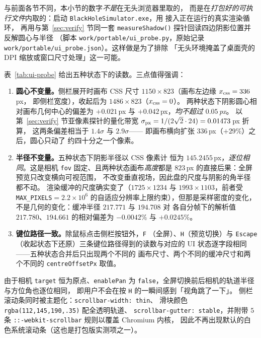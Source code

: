 与前面各节不同，本小节的数字\emph{不是}在无头浏览器里取的，
而是在\emph{打包好的可执行文件}内取的：启动
\texttt{BlackHoleSimulator.exe}，用
 接入正在运行的真实渲染循环，
再用与第~\ref{sec:verify} 节同一套 \texttt{measureShadow()}
探针回读四边阴影位置并反解圆心与半径
（脚本 \texttt{work/portable/ui\_probe.py}，原始记录
\texttt{work/portable/ui\_probe.json}）。这样做是为了排除
「无头环境掩盖了桌面壳的 DPI 缩放或窗口尺寸处理」这一可能。

表~\ref{tab:ui-probe} 给出五种状态下的读数。三点值得强调：

\begin{enumerate}
  \item \textbf{圆心不变量。}侧栏展开时画布 CSS 尺寸
        $1150\times823$（画布左边缘 $x_{\rm css}=336$\,px，
        即侧栏宽度），收起后为 $1486\times823$（$x_{\rm css}=0$）。
        两种状态下阴影圆心相对画布几何中心的偏差为
        $+0.021$\,px 与 $+0.042$\,px，\emph{均不超过 $0.05$\,px}。
        以第~\ref{sec:verify} 节亚像素探针的量化带宽
        $\sigma_{\rm px}=1/(2\sqrt2\cdot24)=0.01473$\,px 折算，
        这两条偏差相当于 $1.4\sigma$ 与 $2.9\sigma$——
        即画布横向扩张 $336$\,px（$+29\%$）之后，圆心只动了
        约四十分之一个像素。
  \item \textbf{半径不变量。}五种状态下阴影半径以 CSS 像素计
        恒为 $145.2455$\,px，\emph{逐位相同}。这是相机
        \texttt{fov} 固定、且两种状态画布\emph{高度}都是 $823$\,px
        的直接后果：全屏预览只改变横向可视范围，
        不改变垂直视场，因此盘的尺度与阴影的角半径都不动。
        渲染缓冲的尺度确实变了（$1725\times1234$ 与
        $1993\times1103$，前者受 \texttt{MAX\_PIXELS}$=2.2\times10^6$
        的自适应分辨率上限约束），但那是采样密度的变化，
        不是几何的变化：缓冲半径 $217.771$ 与 $194.708$ 对
        各自分帧下的解析值 $217.780$、$194.661$ 的相对偏差为
        $-0.0042\%$ 与 $+0.0245\%$。
  \item \textbf{键位路径一致。}除鼠标点击侧栏按钮外，\texttt{F}
        （全屏）、\texttt{H}（预览切换）与 \texttt{Escape}
        （收起状态下还原）三条键位路径得到的读数与对应的
        UI 状态逐字段相同——五种状态合并后只出现两个不同的
        画布尺寸、两个不同的缓冲尺寸和两个不同的
        \texttt{centreOffsetPx} 取值。
\end{enumerate}

由于相机 \texttt{target} 恒为原点、\texttt{enablePan} 为
\texttt{false}，全屏切换前后相机的轨道半径与方位角也逐位相同，
即用户不会在按 \texttt{H} 的一瞬间感到「视角跳了一下」。
侧栏滚动条同时被主题化：\texttt{scrollbar-width: thin}、
滑块颜色 \texttt{rgba(112,145,190,.35)} 配全透明轨道、
\texttt{scrollbar-gutter: stable}，并附带 $5$ 条
\texttt{::-webkit-scrollbar} 规则以覆盖 Chromium 内核，
因此不再出现默认的白色系统滚动条（这也是打包版实测项之一）。

